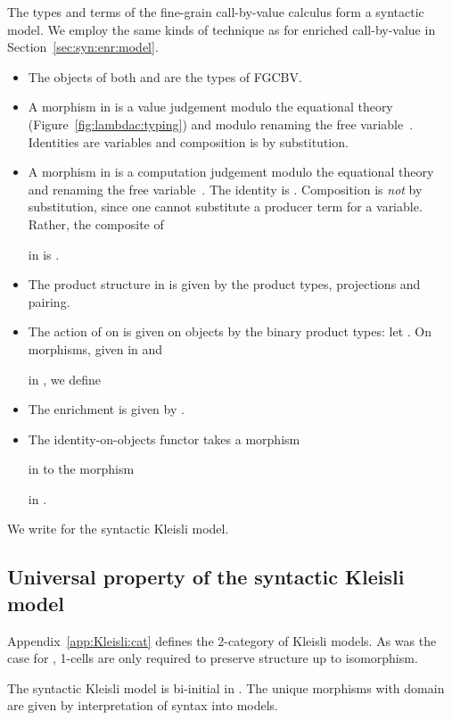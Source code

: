 \documentclass{LMCS}
\begin{document}
The types and terms of the fine-grain call-by-value calculus form 
a syntactic model.
We employ the same kinds of technique as 
for enriched call-by-value in Section~\ref{sec:syn:enr:model}.
\begin{itemize}
\item The objects of both  and  are the types of FGCBV.
\item A morphism  in  is a value judgement
 modulo the equational theory 
(Figure~\ref{fig:lambdac:typing}) and modulo renaming the free variable~.
Identities are variables and composition is by substitution. 
\item 
A morphism  in  
is a computation judgement  modulo the equational theory
 and renaming the free variable~.
The identity  is .
Composition is \emph{not} by substitution,
since one cannot substitute a producer term for a variable.
Rather, the composite of 

in  is 
.
\item The product structure in  is given by the product
types, projections and pairing.
\item The action of  on  is given on objects 
by the binary product types: let .
On morphisms, given  
in  
and 

in ,
we define 

\item The enrichment is given by
.
\item The identity-on-objects functor
 takes a morphism
 
in 
to the morphism
 
in .
\end{itemize}

\noindent We write  for the syntactic Kleisli model.

\subsection{Universal property of the syntactic Kleisli model}
\label{sec:syn:Kl:biinitial}

Appendix~\ref{app:Kleisli:cat} defines the 2-category  of Kleisli models. As was the case for , 
1-cells are only required to preserve structure up to isomorphism. 

\begin{thm} \label{thm:fgcbv:biinitial}
The syntactic Kleisli model  is bi-initial in . The unique 
morphisms with domain  are given by interpretation of syntax into models.
\end{thm}
\end{document}

